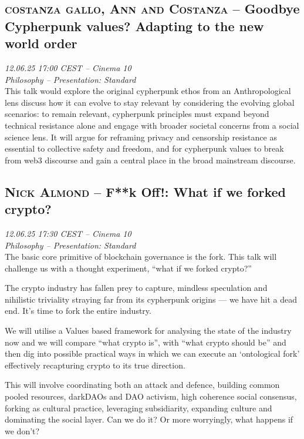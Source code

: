 \clearpage
\subsection {\textsc{costanza gallo, Ann and Costanza}  -- Goodbye Cypherpunk values? Adapting to the new world order} \noindent \textit {12.06.25 17:00 CEST -- Cinema 10\\ Philosophy -- Presentation: Standard}\\[1em] This talk would explore the original cypherpunk ethos from an Anthropological lens discuss how it can evolve to stay relevant by considering the evolving global scenarios: to remain relevant, cypherpunk principles must expand beyond technical resistance alone and engage with broader societal concerns from a social science lens. It will argue for reframing privacy and censorship resistance as essential to collective safety and freedom, and for cypherpunk values to break from web3 discourse and gain a central place in the broad mainstream discourse.

\clearpage
\subsection {\textsc{Nick Almond}  -- F**k Off!: What if we forked crypto?} \noindent \textit {12.06.25 17:30 CEST -- Cinema 10\\ Philosophy -- Presentation: Standard}\\[1em] The basic core primitive of blockchain governance is the fork. This talk will challenge us with a thought experiment, “what if we forked crypto?”

The crypto industry has fallen prey to capture, mindless speculation and nihilistic triviality straying far from its cypherpunk origins — we have hit a dead end. It’s time to fork the entire industry.

We will utilise a Values based framework for analysing the state of the industry now and we will compare “what crypto is”, with “what crypto should be” and then dig into possible practical ways in which we can execute an ‘ontological fork’ effectively recapturing crypto to its true direction.

This will involve coordinating both an attack and defence, building common pooled resources, darkDAOs and DAO activism, high coherence social consensus, forking as cultural practice, leveraging subsidiarity, expanding culture and dominating the social layer. Can we do it? Or more worryingly, what happens if we don’t?

